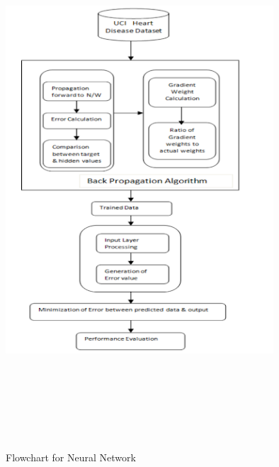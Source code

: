 \documentclass{book}
\begin{document}
\begin{figure}[H]
	\begin{center}
		\includegraphics[width=10cm, height=20cm]{images/neural_network.png}
		\caption{Flowchart for Neural Network}	
	\end{center}
\end{figure}
\end{document}
